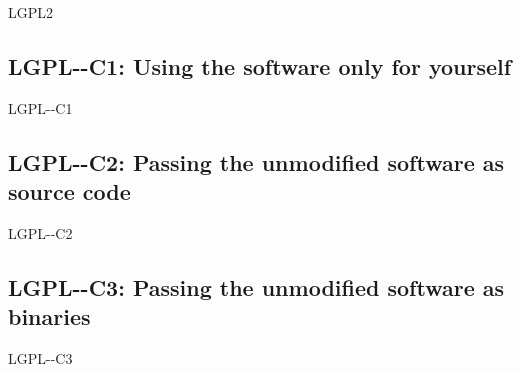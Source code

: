\begin{license}{LGPL2} %

\subsection{LGPL-\ver-C1: Using the software only for yourself}
\begin{lsuc}{LGPL-\ver-C1}
  
  \useCaseOne
  \coversOne

  \begin{lsucrequiresnothing}
  \end{lsucrequiresnothing}

  \lsucprohibitsnothing
\end{lsuc}

\subsection{LGPL-\ver-C2: Passing the unmodified software as source code}
\begin{lsuc}{LGPL-\ver-C2}

  \useCaseTwo
  \coversTwo

  \begin{lsucrequires}
    \lsucmandatory{\keepLicensingElements}
    \lsucmandatory{\lgpltwoEnsureCopyrightNoticeSource}
    \lsucmandatory{\giveLicense}\passingFilesCorrectly
    \lsucoptional{\addToDocumentation}
    \lsucoptional{\keepAllCopyrightNotices}
  \end{lsucrequires}

  \lsucprohibitsnothing
\end{lsuc}

\subsection{LGPL-\ver-C3: Passing the unmodified software as binaries}
\begin{lsuc}{LGPL-\ver-C3} 


\end{lsuc}
\end{license}
